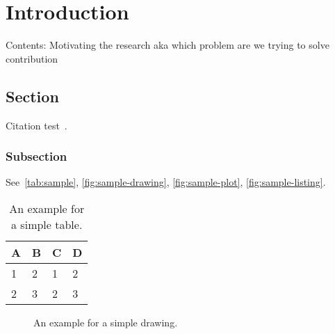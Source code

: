 
\chapter{Introduction}\label{chapter:introduction}

Contents:
  Motivating the research aka which problem are we trying to solve
  contribution

\section{Section}
Citation test~\parencite{latex}.

\subsection{Subsection}

See~\autoref{tab:sample}, \autoref{fig:sample-drawing}, \autoref{fig:sample-plot}, \autoref{fig:sample-listing}.

\begin{table}[htpb]
  \caption[Example table]{An example for a simple table.}\label{tab:sample}
  \centering
  \begin{tabular}{l l l l}
    \toprule
      A & B & C & D \\
    \midrule
      1 & 2 & 1 & 2 \\
      2 & 3 & 2 & 3 \\
    \bottomrule
  \end{tabular}
\end{table}

\begin{figure}[htpb]
  \centering
  \caption[Example drawing]{An example for a simple drawing.}\label{fig:sample-drawing}
\end{figure}

